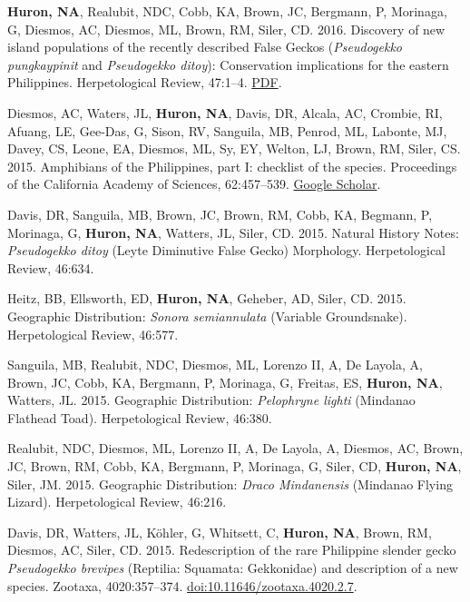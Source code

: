 \documentclass[11pt]{article}
\begin{document}
{\begin{etaremune}[leftmargin=3.30ex, listparindent=0pt,itemindent=-1ex]
 \item \textbf{Huron, NA}, Realubit, NDC, Cobb, KA, Brown, JC, Bergmann, P, Morinaga, G, Diesmos, AC, Diesmos, ML, Brown, RM, Siler, CD. 2016. Discovery of new island populations of the recently described False Geckos (\textit{Pseudogekko pungkaypinit} and \textit{Pseudogekko ditoy}): Conservation implications for the eastern Philippines. Herpetological Review, 47:1--4. \href{https://github.com/nahuron/publication_pdfs/blob/main/2016.Huron.etal.Pseudogekko.Samar.pdf}{\color{blue}PDF}.
 \item Diesmos, AC, Waters, JL, \textbf{Huron, NA}, Davis, DR, Alcala, AC, Crombie, RI, Afuang, LE, Gee-Das, G, Sison, RV, Sanguila, MB, Penrod, ML, Labonte, MJ, Davey, CS, Leone, EA, Diesmos, ML, Sy, EY, Welton, LJ, Brown, RM, Siler, CS. 2015. Amphibians of the Philippines, part I: checklist of the species. Proceedings of the California Academy of Sciences, 62:457--539. \href{https://scholar.google.com/scholar_lookup?title=Amphibians+of+the+Philippines%2C+part+I%3A+checklist+of+the+species&author=AC+Diesmos&author=JL+Watters&author=NA+Huron&author=DR+Davis&author=AC+Alcala&author=RI+Crombie&author=LE+Afuang&author=G+Gee-Das&author=RV+Sison&author=MB+Sanguila&author=ML+Penrod&publication_year=2015}{\color{blue}Google Scholar}.
 \item Davis, DR, Sanguila, MB, Brown, JC, Brown, RM, Cobb, KA, Begmann, P, Morinaga, G, \textbf{Huron, NA}, Watters, JL, Siler, CD. 2015. Natural History Notes: \textit{Pseudogekko ditoy} (Leyte Diminutive False Gecko) Morphology. Herpetological Review, 46:634.
 \item Heitz, BB, Ellsworth, ED, \textbf{Huron, NA}, Geheber, AD, Siler, CD. 2015. Geographic Distribution: \textit{Sonora semiannulata} (Variable Groundsnake). Herpetological Review, 46:577.
 \item Sanguila, MB, Realubit, NDC, Diesmos, ML, Lorenzo II, A, De Layola, A, Brown, JC, Cobb, KA, Bergmann, P, Morinaga, G, Freitas, ES, \textbf{Huron, NA}, Watters, JL. 2015. Geographic Distribution: \textit{Pelophryne lighti} (Mindanao Flathead Toad). Herpetological Review, 46:380.
 \item Realubit, NDC, Diesmos, ML, Lorenzo II, A, De Layola, A, Diesmos, AC, Brown, JC, Brown, RM, Cobb, KA, Bergmann, P, Morinaga, G, Siler, CD, \textbf{Huron, NA}, Siler, JM. 2015. Geographic Distribution: \textit{Draco Mindanensis} (Mindanao Flying Lizard). Herpetological Review, 46:216. 
 \item Davis, DR, Watters, JL, K{\"o}hler, G, Whitsett, C, \textbf{Huron, NA}, Brown, RM, Diesmos, AC, Siler, CD. 2015. Redescription of the rare Philippine slender gecko \textit{Pseudogekko brevipes} (Reptilia: Squamata: Gekkonidae) and description of a new species. Zootaxa, 4020:357--374. \href{https://doi.org/10.11646/zootaxa.4020.2.7}{\color{blue}doi:10.11646/zootaxa.4020.2.7}.\\
\end{etaremune}}%
\end{document}
